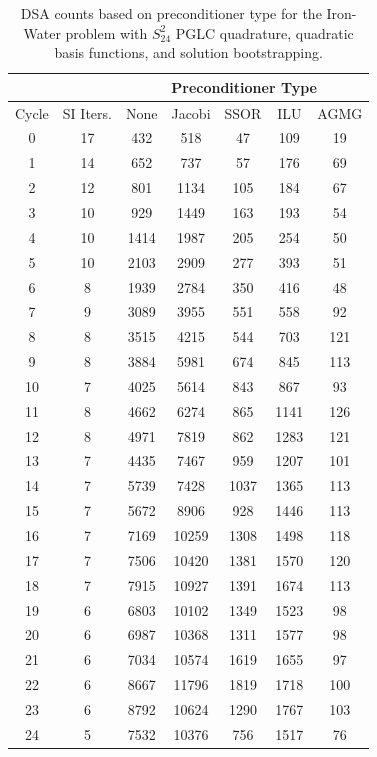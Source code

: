 \begin{table}
\caption{DSA counts based on preconditioner type for the Iron-Water problem with $S_{24}^2$ PGLC quadrature, quadratic basis functions, and solution bootstrapping.}
\begin{center}
\def\arraystretch{1.25}
\begin{tabular}{|c|c|c|c|c|c|c|}
\hline
& & \multicolumn{5}{c}{Preconditioner Type}\vline\\
\hline
Cycle & SI Iters. & None&Jacobi&SSOR& ILU& AGMG \\
\hline
0&17&432&518&47&109&19\\
1&14&652&737&57&176&69\\
2&12&801&1134&105&184&67\\
3&10&929&1449&163&193&54\\
4&10&1414&1987&205&254&50\\
5&10&2103&2909&277&393&51\\
6&8&1939&2784&350&416&48\\
7&9&3089&3955&551&558&92\\
8&8&3515&4215&544&703&121\\
9&8&3884&5981&674&845&113\\
10&7&4025&5614&843&867&93\\
11&8&4662&6274&865&1141&126\\
12&8&4971&7819&862&1283&121\\
13&7&4435&7467&959&1207&101\\
14&7&5739&7428&1037&1365&113\\
15&7&5672&8906&928&1446&113\\
16&7&7169&10259&1308&1498&118\\
17&7&7506&10420&1381&1570&120\\
18&7&7915&10927&1391&1674&113\\
19&6&6803&10102&1349&1523&98\\
20&6&6987&10368&1311&1577&98\\
21&6&7034&10574&1619&1655&97\\
22&6&8667&11796&1819&1718&100\\
23&6&8792&10624&1290&1767&103\\
24&5&7532&10376&756&1517&76\\
\hline
\end{tabular}
\end{center}
\label{tab::DSA_IW_PGLC24_k2_boot}
\end{table}

